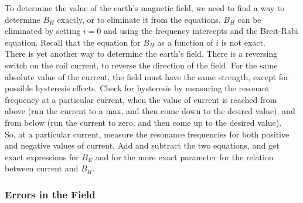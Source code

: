 \documentclass{../lab}
\begin{document}
To determine the value of the earth's magnetic field, we need to find a way to determine $B_H$ exactly, or to eliminate it from the equations. $B_H$ can be eliminated by setting $i = 0$ and using the frequency intercepts and the Breit-Rabi equation. Recall that the equation for $B_H$ as a function of $i$ is not exact. \\

There is yet another way to determine the earth's field. There is a reversing switch on the coil current, to reverse the direction of the field. For the same absolute value of the current, the field must have the same strength, except for possible hysteresis effects. Check for hysteresis by measuring the resonant frequency at a particular current, when the value of current is reached from above (run the current to a max, and then come down to the desired value), and from below (run the current to zero, and then come up to the desired value). \\

So, at a particular current, measure the resonance frequencies for both positive and negative values of current. Add and subtract the two equations, and get exact expressions for $B_E$ and for the more exact parameter for the relation between current and $B_H$.

\subsubsection{Errors in the Field}
\end{document}
